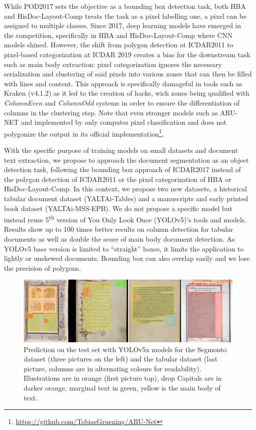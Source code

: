 \documentclass{jdmdh}
\begin{document}
While POD2017 sets the objective as a bounding box detection task, both HBA and HisDoc-Layout-Comp treats the task as a pixel labelling one, a pixel can be assigned to multiple classes. Since 2017, deep learning models have emerged in the competition, specifically in HBA and HisDoc-Layout-Comp where CNN models shined. However, the shift from polygon detection at ICDAR2011 to pixel-based categorization at ICDAR 2019 creates a bias for the downstream task such as main body extraction: pixel categorization ignores the necessary serialization and clustering of said pixels into various zones that can then be filled with lines and content. This approach is specifically damageful in tools such as Kraken (v4.1.2) as it led to the creation of hacks, wich zones being qualified with \textit{ColumnEven} and \textit{ColumnOdd} systems in order to ensure the differentiation of columns in the clustering step. Note that even stronger models such as ARU-NET and implemented by \citet{gruning2018arunet} only computes pixel classification and does not polygonize the output in its official implementation\footnote{\url{https://github.com/TobiasGruening/ARU-Net}}.

With the specific purpose of training models on small datasets and document text extraction, we propose to approach the document segmentation as an object detection task, following the bounding box approach of ICDAR2017 instead of the polygon detection of ICDAR2011 or the pixel categorization of HBA or HisDoc-Layout-Comp. In this context, we propose two new datasets, a historical tabular document dataset (YALTAi-Tables) and a manuscripts and early printed book dataset (YALTAi-MSS-EPB). We do not propose a specific model but instead reuse 5\textsuperscript{th} version of You Only Look Once (YOLOv5)'s tools and models. Results show up to 100 times better results on column detection for tabular documents as well as double the score of main body document detection. As YOLOv5 base version is limited to ``straight'' boxes, it limits the application to lightly or unskewed documents. Bounding box can also overlap easily and we lose the precision of polygons.

\begin{figure}[ht]
    \centering
    \includegraphics[width=\linewidth]{images/4images.jpg}
    \caption{Prediction on the test set with YOLOv5x models for the Segmonto dataset (three pictures on the left) and the tabular dataset (last picture, columns are in alternating colours for readability). Illustrations are in orange (first picture top), drop Capitals are in darker orange, marginal text in green, yellow is the main body of text.}
    \label{fig:4images}
\end{figure}
\end{document}
